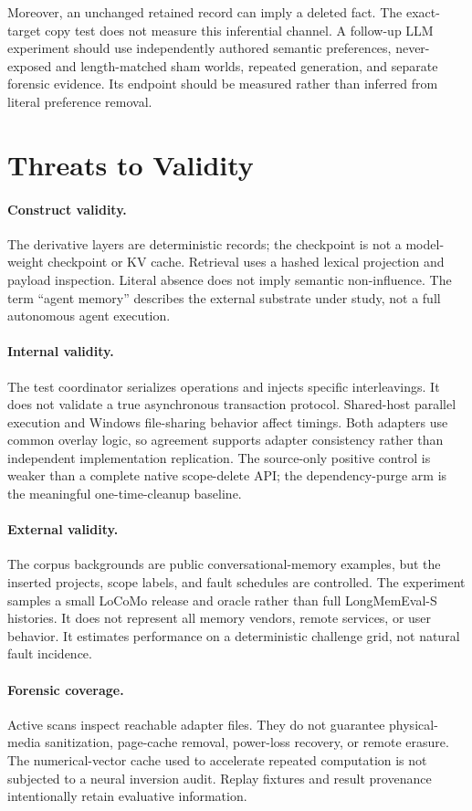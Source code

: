 ﻿\documentclass[sigconf,nonacm]{acmart}
\begin{document}
Moreover, an unchanged retained record can imply a deleted fact. The exact-target copy test does not measure this inferential channel. A follow-up LLM experiment should use independently authored semantic preferences, never-exposed and length-matched sham worlds, repeated generation, and separate forensic evidence. Its endpoint should be measured rather than inferred from literal preference removal.

\section{Threats to Validity}
\paragraph{Construct validity.} The derivative layers are deterministic records; the checkpoint is not a model-weight checkpoint or KV cache. Retrieval uses a hashed lexical projection and payload inspection. Literal absence does not imply semantic non-influence. The term ``agent memory'' describes the external substrate under study, not a full autonomous agent execution.

\paragraph{Internal validity.} The test coordinator serializes operations and injects specific interleavings. It does not validate a true asynchronous transaction protocol. Shared-host parallel execution and Windows file-sharing behavior affect timings. Both adapters use common overlay logic, so agreement supports adapter consistency rather than independent implementation replication. The source-only positive control is weaker than a complete native scope-delete API; the dependency-purge arm is the meaningful one-time-cleanup baseline.

\paragraph{External validity.} The corpus backgrounds are public conversational-memory examples, but the inserted projects, scope labels, and fault schedules are controlled. The experiment samples a small LoCoMo release and oracle rather than full LongMemEval-S histories. It does not represent all memory vendors, remote services, or user behavior. It estimates performance on a deterministic challenge grid, not natural fault incidence.

\paragraph{Forensic coverage.} Active scans inspect reachable adapter files. They do not guarantee physical-media sanitization, page-cache removal, power-loss recovery, or remote erasure. The numerical-vector cache used to accelerate repeated computation is not subjected to a neural inversion audit. Replay fixtures and result provenance intentionally retain evaluative information.
\end{document}
